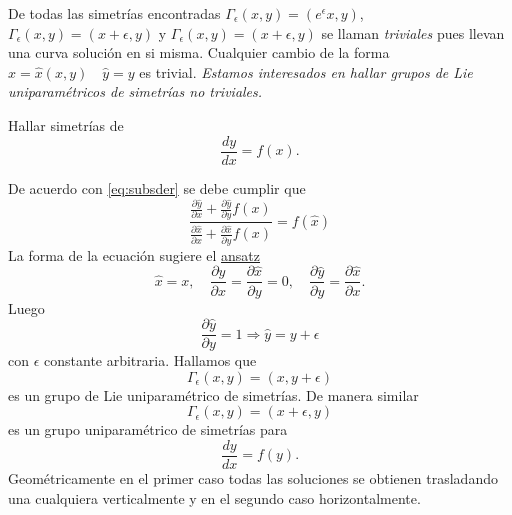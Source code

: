  De todas las simetrías encontradas $\Gamma_{\epsilon}(x,y)=(e^{\epsilon}x,y)$, $\Gamma_{\epsilon}(x,y)=(x+\epsilon,y)$ y  $\Gamma_{\epsilon}(x,y)=(x+\epsilon,y)$ se llaman \emph{triviales} pues llevan una curva solución en si misma.  Cualquier cambio de la forma $\hat{x}=\hat{x}(x,y)\quad \hat{y}=y$ es trivial. \emph{Estamos interesados en hallar grupos de Lie uniparamétricos de simetrías no triviales.}




 \begin{ejemplo}{} Hallar simetrías de
\[\frac{dy}{dx}=f(x).\]
\end{ejemplo}
De acuerdo con \eqref{eq:subsder} se debe cumplir que
 \[\frac{\frac{\partial\hat{y}}{\partial x}+\frac{\partial\hat{y}}{\partial y}f(x)}{\frac{\partial\hat{x}}{\partial x}+\frac{\partial\hat{x}}{\partial y}f(x)}=f(\hat{x})\]
La forma de la ecuación sugiere el  \href{http://es.wikipedia.org/wiki/Ansatz}{ansatz}
   \[\boxed{\hat{x}=x},\quad \frac{\partial\hat{y}}{\partial x}=\frac{\partial\hat{x}}{\partial y}=0,\quad
   \frac{\partial\hat{y}}{\partial y}=\frac{\partial\hat{x}}{\partial x}. \]
 Luego 
\[\frac{\partial\hat{y}}{\partial y}=1\Rightarrow \boxed{\hat{y}=y+\epsilon} \]
con $\epsilon$ constante arbitraria. Hallamos que
\[\Gamma_{\epsilon}(x,y)=(x,y+\epsilon)\]
es un grupo de Lie uniparamétrico de simetrías. De manera similar
\[\Gamma_{\epsilon}(x,y)=(x+\epsilon,y)\]
es un grupo uniparamétrico de simetrías para 
\[\frac{dy}{dx}=f(y).\]
Geométricamente en el primer caso todas las soluciones se obtienen trasladando una cualquiera verticalmente y en el segundo caso horizontalmente.




